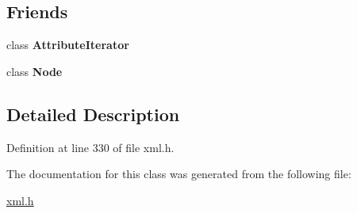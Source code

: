 \subsection*{Friends}
\begin{DoxyCompactItemize}
\item 
\hypertarget{classphys_1_1xml_1_1Attribute_a1ed8790083a80b2604beba1c666bce6e}{
class {\bfseries AttributeIterator}}
\label{da/ddf/classphys_1_1xml_1_1Attribute_a1ed8790083a80b2604beba1c666bce6e}

\item 
\hypertarget{classphys_1_1xml_1_1Attribute_a6db9d28bd448a131448276ee03de1e6d}{
class {\bfseries Node}}
\label{da/ddf/classphys_1_1xml_1_1Attribute_a6db9d28bd448a131448276ee03de1e6d}

\end{DoxyCompactItemize}


\subsection{Detailed Description}


Definition at line 330 of file xml.h.



The documentation for this class was generated from the following file:\begin{DoxyCompactItemize}
\item 
\hyperlink{xml_8h}{xml.h}\end{DoxyCompactItemize}
